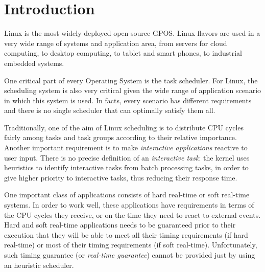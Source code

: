 \chapter{Introduction\label{chap:introduction}}


Linux is the most widely deployed open source GPOS. Linux flavors are 
used in a very wide range of systems and application area, from servers 
for cloud computing, to desktop computing, to tablet and smart phones, 
to industrial embedded systems. 

One critical part of every Operating System is the task scheduler. For
Linux, the scheduling system is also very critical given the wide
range of application scenario in which this system is used. In facts,
every scenario has different requirements and there is no single
scheduler that can optimally satisfy them all.

Traditionally, one of the aim of Linux scheduling is to distribute CPU
cycles fairly among tasks and task groups according to their relative
importance. Another important requirement is to make \emph{interactive
  applications} reactive to user input. There is no precise definition
of an \emph{interactive task}: the kernel uses heuristics to identify
interactive tasks from batch processing tasks, in order to give higher
priority to interactive tasks, thus reducing their response time.

One important class of applications consists of hard real-time or soft
real-time systems. In order to work well, these applications have
requirements in terms of the CPU cycles they receive, or on the time
they need to react to external events. Hard and soft real-time
applications needs to be guaranteed prior to their execution that they
will be able to meet all their timing requirements (if hard real-time)
or most of their timing requirements (if soft real-time).
Unfortunately, such timing guarantee (or \emph{real-time guarantee})
cannot be provided just by using an heuristic scheduler. 

